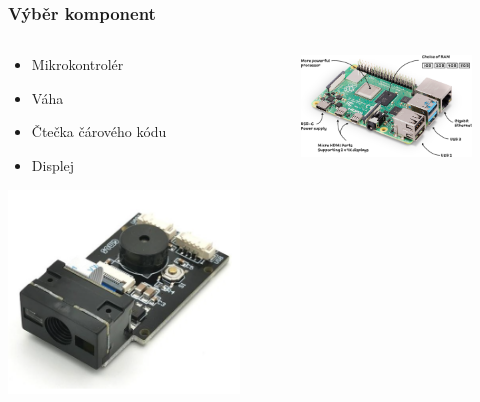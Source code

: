 \documentclass[%
  12pt,       				%
	t,                  %
	aspectratio=1610,   %
	unicode,						%
]{beamer}				    	%
\begin{document}
\begin{frame} 
	\frametitle{Výběr komponent}
	
	\begin{columns}[T] 								%
		\begin{column}{0.4\textwidth}		%
			\begin{itemize}
				\item Mikrokontrolér
				\item Váha
				\item Čtečka čárového kódu
				\item Displej
			\end{itemize}
            \vspace{1cm}
            \includegraphics[width=0.7\columnwidth]{obrazky/gm65.PNG}
		\end{column}
		\begin{column}{0.6\textwidth}		%
			\begin{figure}%
				\centering
				\includegraphics[width=0.7\columnwidth]{obrazky/raspberry-pi-4.png}

\end{figure}
\end{column}
\end{columns}
\end{frame}
\end{document}
